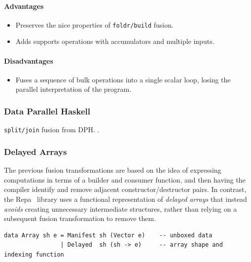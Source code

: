 \paragraph{Advantages}
\begin{itemize}
    \item Preserves the nice properties of
        \texttt{foldr/build} fusion.
    \item Adds supports operations with accumulators and multiple inputs.
\end{itemize}

\paragraph{Disadvantages}
\begin{itemize}
    \item Fuses a sequence of bulk operations into a single scalar loop, losing
        the parallel interpretation of the program.
\end{itemize}



\subsubsection{Data Parallel Haskell}
\texttt{split/join} fusion from
DPH.
\citet{Chakravarty:2007tc,Jones:2008uu}.


\subsubsection{Delayed Arrays}

The previous fusion transformations are based on the idea of expressing
computations in terms of a builder and consumer function, and then having the
compiler identify and remove adjacent constructor/destructor pairs. In contrast,
the Repa~\cite{Keller:2010er} library uses a functional representation of
\emph{delayed arrays} that instead \emph{avoids}
creating unnecessary intermediate structures, rather than relying on a
subsequent fusion transformation to remove them.

\begin{lstlisting}[style=Haskell,numbers=none,caption={Repa-1 style array definition},label={lst:repa_arrays}]
data Array sh e = Manifest sh (Vector e)    -- unboxed data
                | Delayed  sh (sh -> e)     -- array shape and indexing function
\end{lstlisting}

